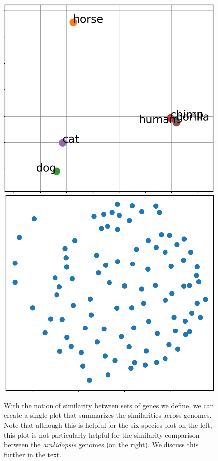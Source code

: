 \documentclass{vgtc}                      %
\begin{document}
\begin{figure}[t]
 \centering
 \includegraphics[width=0.48\columnwidth]{synmap_n}
 \includegraphics[width=0.48\columnwidth]{chr_all_scatter}
 \caption{With the notion of similarity between sets of genes we define, we can create a single plot that summarizes the similarities across genomes. Note that although this is helpful for the six-species plot on the left, this plot is not particularly helpful for the similarity comparison between the \emph{arabidopsis} genomes (on the right). We discuss this further in the text.}
 \label{fig:synmap_n}
\end{figure}


\end{document}
